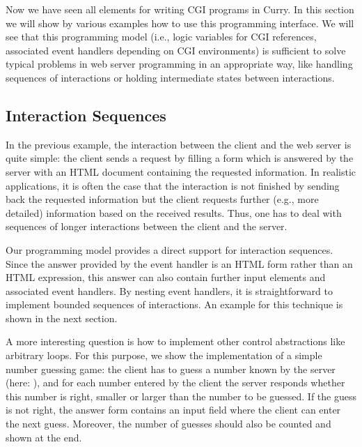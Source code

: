 Now we have seen all elements for writing CGI programs
in Curry.
In this section we will show by various examples how to use
this programming interface. We will see that this programming model
(i.e., logic variables for CGI references,
associated event handlers depending on CGI environments)
is sufficient to solve typical problems in web server programming
in an appropriate way, like
handling sequences of interactions or
holding intermediate states between interactions.


\subsection{Interaction Sequences}

In the previous example, the interaction between the
client and the web server is quite simple:
the client sends a request by filling a form which is answered
by the server with an HTML document containing the requested
information. In realistic applications, it is often the case
that the interaction is not finished by sending back the requested
information but the client requests further (e.g., more detailed)
information based on the received results. Thus, one
has to deal with sequences of longer interactions between the
client and the server.

Our programming model provides a direct support for
interaction sequences. Since the answer provided by the event handler
is an HTML form rather than an HTML expression,
this answer can also contain further input elements
and associated event handlers. By nesting event handlers,
it is straightforward to implement bounded sequences of interactions.
An example for this technique is shown in the next section.

A more interesting question is how to implement
other control abstractions like arbitrary loops.
For this purpose, we show the implementation of a simple
number guessing game: the client has to guess a number
known by the server (here: ), and for each number entered
by the client the server responds whether this number
is right, smaller or larger than the number to be guessed.
If the guess is not right, the answer form contains an input
field where the client can enter the next guess.
Moreover, the number of guesses should also be counted
and shown at the end.

